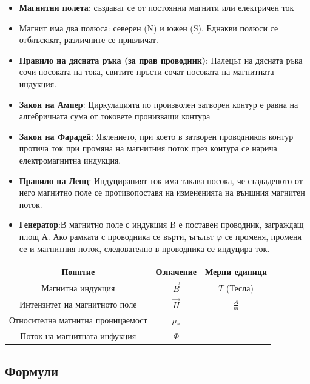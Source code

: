 \documentclass[fleqn, 12pt]{article}
\theoremstyle{definition}
\begin{document}
\begin{itemize}
\item \textbf{Магнитни полета}: създават се от постоянни магнити или електричен ток
\item Магнит има два полюса: северен (N) и южен (S). Еднакви полюси се отблъскват, различните се привличат. 
\item \textbf{Правило на дясната ръка (за прав проводник)}: Палецът на дясната ръка сочи
посоката на тока, свитите пръсти сочат посоката на магнитната индукция. 
\item \textbf{Закон на Ампер}: Циркулацията по произволен затворен контур е равна на алгебричната сума от токовете пронизващи контура 
\item \textbf{Закон на Фарадей}: Явлението, при което в затворен проводников контур протича ток при промяна на магнитния поток през контура се нарича електромагнитна индукция.  
\item \textbf{Правило на Ленц}: Индуцираният ток има такава посока, че създаденото от него магнитно поле се противопоставя на измененията на външния магнитен поток.
\item \textbf{Генератор}:В магнитно поле с индукция B е поставен проводник, заграждащ площ А. Ако рамката с проводника се върти, ъгълът $\varphi$ се променя, променя се и магнитния поток, следователно в проводника се индуцира ток.
\end{itemize}

\begin{center}
\begin{tabular}{ |c|c|c|}
\hline
\textbf{Понятие} &\textbf{Означение} & \textbf{Мерни единици}\\
\hline
Магнитна индукция & $\vec{B}$ & $T$ (Тесла)\\
\hline
Интензитет на магнитното поле& $\vec{H}$ & $\frac{A}{m}$ \\
\hline
Относителна матнитна проницаемост& $\mu_r$ &  \\
\hline
Поток на магнитната инфукция& $\Phi$ & \\
\hline
\end{tabular}
\end{center}

\newpage
\subsection{Формули}
\end{document}
